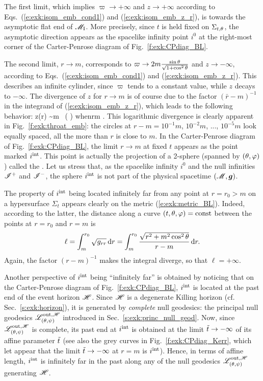 The first limit, which implies $\varpi \to +\infty$ and $z \to +\infty$
according to Eqs.~(\ref{e:exk:isom_emb_cond1}) and (\ref{e:exk:isom_emb_z_r}),
is towards the asymptotic flat end of $\mathscr{M}_{\rm I}$.
More precisely, since $t$ is held fixed on $\Sigma_{t,\theta}$, the asymptotic
direction appears as the
spacelike infinity point $i^0$ at the right-most corner
of the Carter-Penrose diagram of Fig.~\ref{f:exk:CPdiag_BL}.

The second limit, $r\to m$, corresponds to
$\varpi \to 2m\frac{\sin\theta}{\sqrt{1 + \cos^2\theta}}$ and $z\to -\infty$,
according to Eqs.~(\ref{e:exk:isom_emb_cond1}) and (\ref{e:exk:isom_emb_z_r}).
This describes an infinite cylinder, since
$\varpi$ tends to a constant value, while $z$ decays to $-\infty$.
The divergence of $z$ for $r\to m$ is of course due to the
factor $(\bar{r} - m)^{-1}$ in the integrand of (\ref{e:exk:isom_emb_z_r}),
which leads to the following behavior:
\be
    z(r) \sim m  \, \ln \left(  \right)
    \quad\mbox{when}\quad r\to m .
\ee
This logarithmic divergence is clearly apparent in Fig.~\ref{f:exk:throat_emb}:
the circles at $r - m = 10^{-1} m$, $10^{-2} m$, ..., $10^{-5} m$ look
equally spaced, all the more than $r$ is close to $m$.
In the Carter-Penrose diagram of Fig.~\ref{f:exk:CPdiag_BL}, the limit $r\to m$
at fixed $t$ appears as the point marked $i^{\rm int}$. This point is actually
the projection of a 2-sphere (spanned by $(\theta,\varphi)$) called
the . Let us stress that, as the spacelike infinity $i^0$
and the null infinities $\mathscr{I}^+$ and $\mathscr{I}^-$, the sphere $i^{\rm int}$
is not part of the physical spacetime $(\mathscr{M},\bm{g})$.

The property of $i^{\rm int}$ being located infinitely far from any point at $r=r_0>m$ on
a hypersurface $\Sigma_t$ appears clearly
on the metric (\ref{e:exk:metric_BL}). Indeed,
according to the latter, the distance along a
curve $(t,\theta,\varphi)=\mathrm{const}$ between the points
at $r=r_0$ and $r=m$ is
\[
    \ell = \int_{m}^{r_0} \sqrt{g_{rr}} \, \mathrm{d} r =
    \int_{m}^{r_0} \frac{\sqrt{r^2 + m^2\cos^2\theta}}{r - m} \, \mathrm{d} r .
\]
Again, the factor $(r - m)^{-1}$ makes the integral diverge, so that $\ell = +\infty$.

Another perspective of $i^{\rm int}$ being ``infinitely far'' is obtained by noticing
that on the Carter-Penrose diagram of Fig.~\ref{f:exk:CPdiag_BL},
$i^{\rm int}$ is located at the past end of the event horizon $\mathscr{H}$. Since
$\mathscr{H}$ is a degenerate Killing horizon (cf. Sec.~\ref{s:exk:horizon}), it is generated by
\emph{complete} null geodesics: the principal null geodesics $\mathscr{L}^{{\rm out},\mathscr{H}}_{(\theta,\psi)}$
introduced in Sec.~\ref{s:exk:princ_null_geod}. Now, since
$\mathscr{L}^{{\rm out},\mathscr{H}}_{(\theta,\psi)}$ is complete, its past end at $i^{\rm int}$ is obtained at the limit ${\tilde t}\to -\infty$ of its
affine parameter ${\tilde t}$ (see also the grey curves in Fig.~\ref{f:exk:CPdiag_Kerr}, which let appear that
the limit ${\tilde t}\to -\infty$ at $r=m$ is
$i^{\rm int}$). Hence, in terms of affine length, $i^{\rm int}$ is infinitely
far in the past along any of the null geodesics $\mathscr{L}^{{\rm out},\mathscr{H}}_{(\theta,\psi)}$
generating $\mathscr{H}$.

